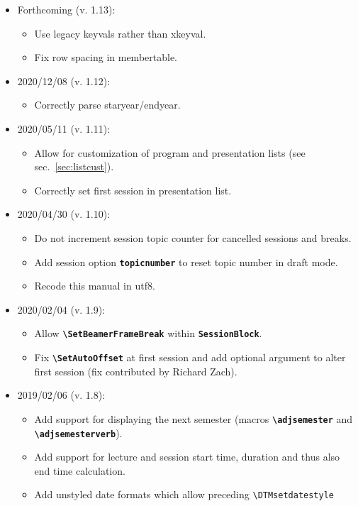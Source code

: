 \documentclass[english]{article}
\newcommand*\jmacro[1]{\textbf{\texttt{#1}}}
\newcommand*\jcsmacro[1]{\jmacro{\textbackslash{#1}}}
\newcommand*\joption[1]{\textbf{\texttt{#1}}}
\newcommand*\jfmacro[1]{\texttt{#1}}
\newcommand*\jfcsmacro[1]{\jfmacro{\textbackslash{#1}}}
\begin{document}
\begin{itemize}
\item Forthcoming (v. 1.13):
\begin{itemize}
	\item Use legacy keyvals rather than \textsf{xkeyval}.
	\item Fix row spacing in membertable.
\end{itemize}
\item 2020/12/08 (v. 1.12):
	\begin{itemize}
		\item Correctly parse staryear/endyear.
	\end{itemize}
\item 2020/05/11 (v. 1.11):
	\begin{itemize}
		\item Allow for customization of program and presentation lists (see sec.~\ref{sec:listcust}).
		\item Correctly set first session in presentation list.
	\end{itemize}
\item 2020/04/30 (v. 1.10):
	\begin{itemize}
		\item Do not increment session topic counter for cancelled sessions and breaks.
		\item Add session option \joption{topicnumber} to reset topic number in draft mode.
		\item Recode this manual in utf8.
	\end{itemize}
\item 2020/02/04 (v. 1.9):
	\begin{itemize}
		\item Allow \jcsmacro{SetBeamerFrameBreak} within \joption{SessionBlock}.
		\item Fix \jcsmacro{SetAutoOffset} at first session and add optional argument
		      to alter first session (fix contributed by Richard Zach).
	\end{itemize}
\item 2019/02/06 (v. 1.8):
	\begin{itemize}
		\item Add support for displaying the next semester (macros \jcsmacro{adjsemester} and
		      \jcsmacro{adjsemesterverb}).
		\item Add support for lecture and session start time, duration and thus also end time
		      calculation.
		\item Add unstyled date formats which allow preceding \jfcsmacro{DTMsetdatestyle}

\end{itemize}
\end{itemize}
\end{document}
